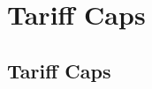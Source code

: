 \documentclass[handout]{beamer}
\newcommand{\ga}{\gamma}
\begin{document}
\section{Tariff Caps}
\subsection{Tariff Caps}

\end{document}
